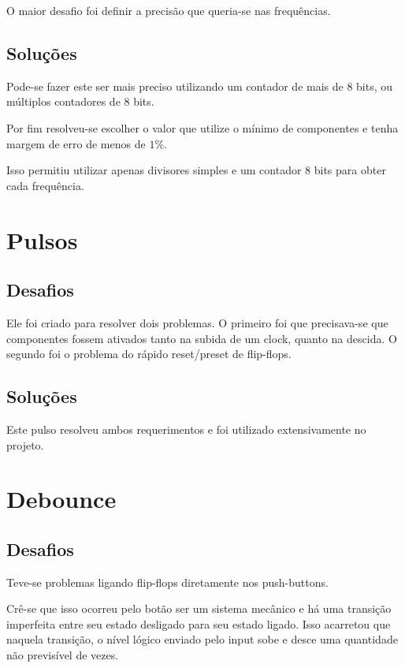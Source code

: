 O maior desafio foi definir a precisão que queria-se nas frequências.

\subsection{Soluções}

Pode-se fazer este ser mais preciso utilizando um contador de mais de 8 bits, ou múltiplos contadores de 8 bits.

Por fim resolveu-se escolher o valor que utilize o mínimo de componentes e tenha margem de erro de menos de $1\%$.

Isso permitiu utilizar apenas divisores simples e um contador 8 bits para obter cada frequência.

\section{Pulsos}

\subsection{Desafios}

Ele foi criado para resolver dois problemas. O primeiro foi que precisava-se que componentes fossem ativados tanto na subida de um clock, quanto na descida. O segundo foi o problema do rápido reset/preset de flip-flops.

\subsection{Soluções}

Este pulso resolveu ambos requerimentos e foi utilizado extensivamente no projeto.

\section{Debounce}

\subsection{Desafios}

Teve-se problemas ligando flip-flops diretamente nos push-buttons. 

Crê-se que isso ocorreu pelo botão ser um sistema mecânico e há uma transição imperfeita entre seu estado desligado para seu estado ligado. Isso acarretou que naquela transição, o nível lógico enviado pelo input sobe e desce uma quantidade não previsível de vezes.

